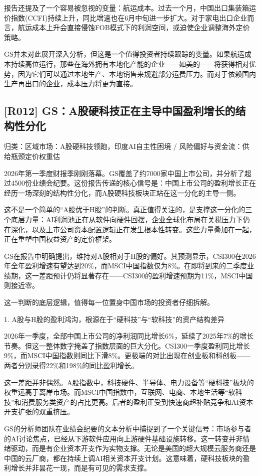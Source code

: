 \documentclass[11pt]{ctexart}
\begin{document}
报告还提及了一个容易被忽视的变量：航运成本。过去一个月，中国出口集装箱运价指数(CCFI)持续上升，同比增速也在6月中旬进一步扩大。对于家电出口企业而言，航运成本上升会直接侵蚀FOB模式下的利润空间，或迫使企业调整海外定价策略。

GS并未对此展开深入分析，但这是一个值得投资者持续跟踪的变量。如果航运成本持续高位运行，那些在海外拥有本地化产能的企业——如美的——将获得相对优势，因为它们可以通过本地生产、本地销售来规避部分运费压力。而对于依赖国内生产再出口的企业，成本压力将更为直接。

\subsection{[R012] GS：A股硬科技正在主导中国盈利增长的结构性分化}
{\small\color{refgray}归类：区域市场：A股硬科技领跑，印度AI自主性困境 / 风险偏好与资金流：供给瓶颈定价权重估}

2026年第一季度财报季刚刚落幕。GS覆盖了约7000家中国上市公司，并分析了超过4500份业绩会纪要。这份报告传递的核心信号是：中国上市公司的盈利增长正在经历一场深刻的结构性分化，而A股硬科技板块正站在这一分化的主导一侧。

这不是一个简单的“A股优于H股”的判断。真正值得关注的，是支撑这一分化的三个底层力量：AI利润池正在从软件向硬件回摆，企业全球化布局在关税压力下仍在深化，以及上市公司资本配置逻辑正在发生根本性转变。这些力量叠加在一起，正在重塑中国权益资产的定价框架。

GS在报告中明确提出，维持对A股相对于H股的偏好。其预测显示，CSI300在2026年全年盈利增速有望达到20\%，而MSCI中国指数仅为8\%。在即将到来的二季度业绩期，这一差距预计仍将显著存在——CSI300的盈利增速预期为11\%，MSCI中国则接近零。

这一判断的底层逻辑，值得每一位置身中国市场的投资者仔细拆解。

1. A股与H股的盈利鸿沟，根源在于“硬科技”与“软科技”的资产结构差异

2026年一季度，全部中国上市公司的净利润同比增长6\%，延续了2025年7\%的增长节奏。但这一整体数字掩盖了指数层面的巨大分化。CSI300一季度盈利同比增长9\%，而MSCI中国指数则同比下滑8\%。更极端的对比出现在创业板和科创板——两者分别录得22\%和198\%的同比盈利增长。

这一差距并非偶然。A股指数中，科技硬件、半导体、电力设备等“硬科技”板块的权重远高于离岸市场。而MSCI中国指数中，互联网、电商、本地生活等“软科技”和消费服务类资产的占比更高。后者的盈利正受到快速商超补贴竞争和AI资本开支扩张的双重挤压。

GS的分析师团队在业绩会纪要的文本分析中捕捉到了一个关键信号：市场参与者的AI讨论焦点，已经从下游软件应用向上游硬件基础设施转移。这一转变并非情绪驱动，而是有企业资本开支作为实物支撑。无论是美国的超大规模云服务商还是中国的云厂商，都在持续上调AI相关资本开支计划。这意味着，硬科技板块的盈利增长并非昙花一现，而是有可见的需求支撑。
\end{document}
